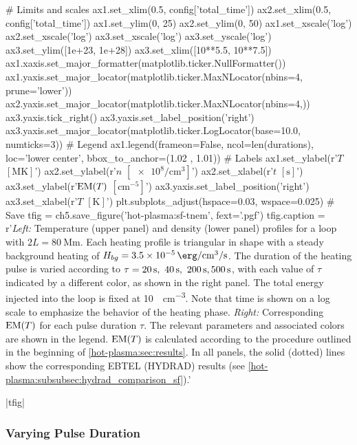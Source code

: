 \begin{pycode}[chapter5]
# Limits and scales
ax1.set_xlim(0.5, config['total_time'])
ax2.set_xlim(0.5, config['total_time'])
ax1.set_ylim(0, 25)
ax2.set_ylim(0, 50)
ax1.set_xscale('log')
ax2.set_xscale('log')
ax3.set_xscale('log')
ax3.set_yscale('log')
ax3.set_ylim([1e+23, 1e+28])
ax3.set_xlim([10**5.5, 10**7.5])
ax1.xaxis.set_major_formatter(matplotlib.ticker.NullFormatter())
ax1.yaxis.set_major_locator(matplotlib.ticker.MaxNLocator(nbins=4, prune='lower'))
ax2.yaxis.set_major_locator(matplotlib.ticker.MaxNLocator(nbins=4,))
ax3.yaxis.tick_right()
ax3.yaxis.set_label_position('right')
ax3.yaxis.set_major_locator(matplotlib.ticker.LogLocator(base=10.0, numticks=3))
# Legend
ax1.legend(frameon=False, ncol=len(durations), loc='lower center',
           bbox_to_anchor=(1.02 , 1.01))
# Labels
ax1.set_ylabel(r'$T$ $[\si{\mega\kelvin}]$')
ax2.set_ylabel(r'$n$ $[\num{e8}\si{\per\cubic\cm}]$')
ax2.set_xlabel(r'$t$ $[\si{\second}]$')
ax3.set_ylabel(r'$\textup{EM}(T)$ $[\si{\cm\tothe{-5}}]$')
ax3.yaxis.set_label_position('right')
ax3.set_xlabel(r'$T$ $[\si{\kelvin}]$')
plt.subplots_adjust(hspace=0.03, wspace=0.025)
# Save
tfig = ch5.save_figure('hot-plasma:sf-tnem', fext='.pgf')
tfig.caption = r'\textit{Left:} Temperature (upper panel) and density (lower panel) profiles for a loop with $2L=\SI{80}{\mega\m}$. Each heating profile is triangular in shape with a steady background heating of $H_{bg}=\SI{3.5e-5}{\erg\per\cubic\cm\per\second}$. The duration of the heating pulse is varied according to $\tau=\SIlist[list-final-separator = {,}]{20;40;200;500}{\second}$, with each value of $\tau$ indicated by a different color, as shown in the right panel. The total energy injected into the loop is fixed at \SI{10}{\erg\per\cubic\cm}. Note that time is shown on a log scale to emphasize the behavior of the heating phase. \textit{Right:} Corresponding $\emd[T]$ for each pulse duration $\tau$. The relevant parameters and associated colors are shown in the legend. $\emd[T]$ is calculated according to the procedure outlined in the beginning of \autoref{hot-plasma:sec:results}. In all panels, the solid (dotted) lines show the corresponding EBTEL (HYDRAD) results (see \autoref{hot-plasma:subsubsec:hydrad_comparison_sf}).'
\end{pycode}
\py[chapter5]|tfig|

\subsubsection{Varying Pulse Duration}\label{hot-plasma:subsubsec:pulse_res}

